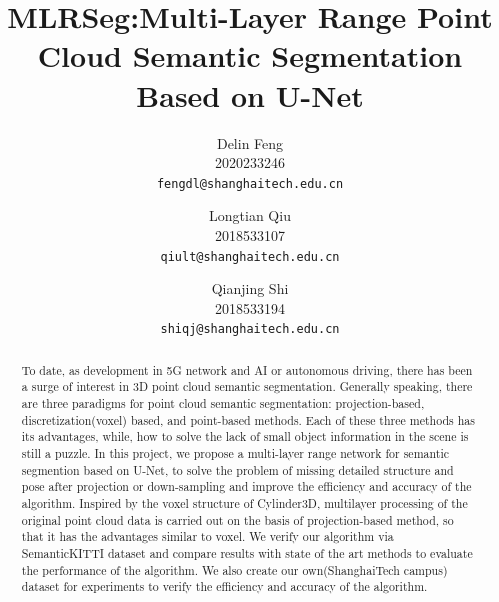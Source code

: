 \documentclass[final]{cvpr}
\begin{document}
\title{MLRSeg:Multi-Layer Range Point Cloud Semantic Segmentation Based on U-Net }

\author{Delin Feng\\
2020233246\\
{\tt\small fengdl@shanghaitech.edu.cn}
\and
Longtian Qiu\\
2018533107\\
{\tt\small qiult@shanghaitech.edu.cn}
\and
Qianjing Shi\\
2018533194\\
{\tt\small shiqj@shanghaitech.edu.cn}
}

\maketitle


\begin{abstract}
To date, as development in 5G network and AI or autonomous driving, there has been a surge of interest in 3D point cloud semantic segmentation. Generally speaking, there are three paradigms for point cloud semantic segmentation: projection-based, discretization(voxel) based, and point-based methods. Each of these three methods has its advantages, while, how to solve the lack of small object information in the scene is still a puzzle. In this project,  we propose a multi-layer range network for semantic segmention based on U-Net, to solve the problem of missing detailed structure and pose after projection or down-sampling and improve the efficiency and accuracy of the algorithm. Inspired by the voxel structure of Cylinder3D, multilayer processing of the original point cloud data is carried out on the basis of projection-based method, so that it has the advantages similar to voxel.  We verify our algorithm via SemanticKITTI dataset and compare results with state of the art methods to evaluate the performance of the algorithm. We also create our own(ShanghaiTech campus) dataset for experiments to verify the efficiency and accuracy of the algorithm.
\end{abstract}

\end{document}
